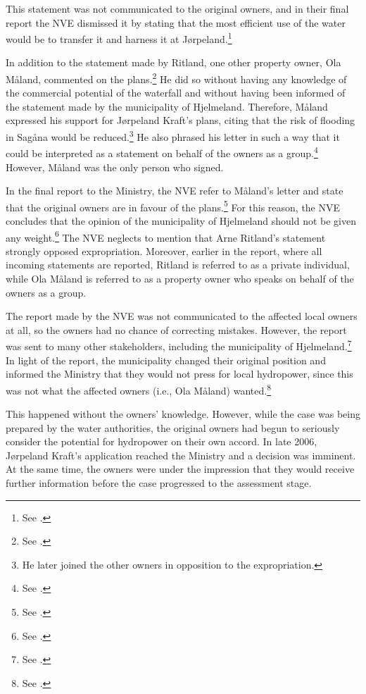 This statement was not communicated to the original owners, and in their final report the NVE dismissed it by stating that the most efficient use of the water would be to transfer it and harness it at Jørpeland.\footnote{See \cite[19]{jorpeland09}.}

In addition to the statement made by Ritland, one other property owner, Ola Måland, commented on the plans.\footnote{See \cite[17]{jorpeland09}.} He did so without having any knowledge of the commercial potential of the waterfall and without having been informed of the statement made by the municipality of Hjelmeland. Therefore, Måland expressed his support for Jørpeland Kraft's plans, citing that the risk of flooding in Sagåna would be reduced.\footnote{He later joined the other owners in opposition to the expropriation.} He also phrased his letter in such a way that it could be interpreted as a statement on behalf of the owners as a group.\footnote{See \cite[17]{jorpeland09}.} However, Måland was the only person who signed.

In the final report to the Ministry, the NVE refer to Måland's letter and state that the original owners are in favour of the plans.\footnote{See \cite[19]{jorpeland09}.} For this reason, the NVE concludes that the opinion of the municipality of Hjelmeland should not be given any weight.\footnote{See \cite[19]{jorpeland09}.} The NVE neglects to mention that Arne Ritland's statement strongly opposed expropriation. Moreover, earlier in the report, where all incoming statements are reported, Ritland is referred to as a private individual, while Ola Måland is referred to as a property owner who speaks on behalf of the owners as a group.

The report made by the NVE was not communicated to the affected local owners at all, so the owners had no chance of correcting mistakes. However, the report was sent to many other stakeholders, including the municipality of Hjelmeland.\footnote{See \cite[24]{jorpeland09}.} In light of the report, the municipality changed their original position and informed the Ministry that they would not press for local hydropower, since this was not what the affected owners (i.e., Ola Måland) wanted.\footnote{See \cite[24]{jorpeland09}.}

This happened without the owners' knowledge. However, while the case was being prepared by the water authorities, the original owners had begun to seriously consider the potential for hydropower on their own accord. In late 2006, Jørpeland Kraft's application reached the Ministry and a decision was imminent. At the same time, the owners were under the impression that they would receive further information before the case progressed to the assessment stage.

